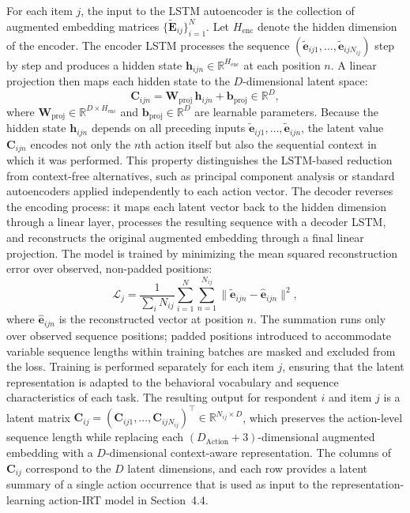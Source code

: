 \documentclass[A4paper,11pt]{article}
\begin{document}
For each item $j$, the input to the LSTM autoencoder is the collection of augmented embedding matrices $\{\tilde{\mathbf{E}}_{ij}\}_{i=1}^{N}$. Let $H_{\mathrm{enc}}$ denote the hidden dimension of the encoder. The encoder LSTM processes the sequence $(\tilde{\mathbf{e}}_{ij1},\ldots,\tilde{\mathbf{e}}_{ijN_{ij}})$ step by step and produces a hidden state $\mathbf{h}_{ijn}\in\mathbb{R}^{H_{\mathrm{enc}}}$ at each position $n$. A linear projection then maps each hidden state to the $D$-dimensional latent space:
\[
\mathbf{C}_{ijn}
=
\mathbf{W}_{\mathrm{proj}}\,\mathbf{h}_{ijn}+\mathbf{b}_{\mathrm{proj}}
\in\mathbb{R}^{D},
\]
where $\mathbf{W}_{\mathrm{proj}}\in\mathbb{R}^{D\times H_{\mathrm{enc}}}$ and $\mathbf{b}_{\mathrm{proj}}\in\mathbb{R}^{D}$ are learnable parameters. Because the hidden state $\mathbf{h}_{ijn}$ depends on all preceding inputs $\tilde{\mathbf{e}}_{ij1},\ldots,\tilde{\mathbf{e}}_{ijn}$, the latent value $\mathbf{C}_{ijn}$ encodes not only the $n$th action itself but also the sequential context in which it was performed. This property distinguishes the LSTM-based reduction from context-free alternatives, such as principal component analysis or standard autoencoders applied independently to each action vector. The decoder reverses the encoding process: it maps each latent vector back to the hidden dimension through a linear layer, processes the resulting sequence with a decoder LSTM, and reconstructs the original augmented embedding through a final linear projection. The model is trained by minimizing the mean squared reconstruction error over observed, non-padded positions:
\[
\mathcal{L}_{j}
=
\frac{1}{\sum_{i}N_{ij}}
\sum_{i=1}^{N}\sum_{n=1}^{N_{ij}}
\bigl\|\tilde{\mathbf{e}}_{ijn}
-\hat{\mathbf{e}}_{ijn}\bigr\|^{2},
\]
where $\hat{\mathbf{e}}_{ijn}$ is the reconstructed vector at position $n$. The summation runs only over observed sequence positions; padded positions introduced to accommodate variable sequence lengths within training batches are masked and excluded from the loss. Training is performed separately for each item $j$, ensuring that the latent representation is adapted to the behavioral vocabulary and sequence characteristics of each task. The resulting output for respondent $i$ and item $j$ is a latent matrix $\mathbf{C}_{ij}=(\mathbf{C}_{ij1},\ldots,\mathbf{C}_{ijN_{ij}})^{\top} \in\mathbb{R}^{N_{ij}\times D}$, which preserves the action-level sequence length while replacing each $(D_{\mathrm{Action}}+3)$-dimensional augmented embedding with a $D$-dimensional context-aware representation. The columns of $\mathbf{C}_{ij}$ correspond to the $D$ latent dimensions, and each row provides a latent summary of a single action occurrence that is used as input to the representation-learning action-IRT model in Section~4.4.
\end{document}
